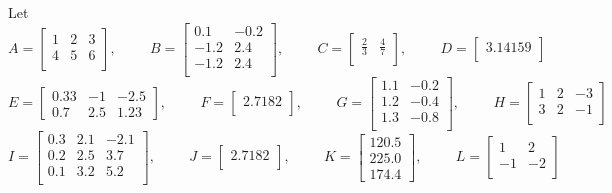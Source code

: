 Let 
\[
A
= 
\begin{bmatrix}
1 & 2 & 3 \\
4 & 5 & 6 \\
\end{bmatrix}
, 
\hspace{1cm}
B
= 
\begin{bmatrix}
0.1 & -0.2 \\
-1.2 & 2.4 \\
-1.2 & 2.4 \\
\end{bmatrix}
, 
\hspace{1cm}
C
= 
\begin{bmatrix}
\frac{2}{3} & \frac{4}{7} \\
\end{bmatrix}
, 
\hspace{1cm}
D
= 
\begin{bmatrix}
3.14159 \\
\end{bmatrix}
\]
\[
E
= 
\begin{bmatrix}
0.33 & -1 & -2.5 \\
0.7 & 2.5 & 1.23
\end{bmatrix}
, 
\hspace{1cm}
F
= 
\begin{bmatrix}
2.7182 \\
\end{bmatrix}
, 
\hspace{1cm}
G
= 
\begin{bmatrix}
1.1 & -0.2 \\
1.2 & -0.4 \\
1.3 & -0.8 \\
\end{bmatrix}
, 
\hspace{1cm}
H
= 
\begin{bmatrix}
1 & 2 & -3 \\
3 & 2 & -1 \\
\end{bmatrix}
\]
\[
I
= 
\begin{bmatrix}
0.3 & 2.1 & -2.1 \\
0.2 & 2.5 & 3.7 \\
0.1 & 3.2 & 5.2 \\
\end{bmatrix}
, 
\hspace{1cm}
J
= 
\begin{bmatrix}
2.7182 \\
\end{bmatrix}
, 
\hspace{1cm}
K
= 
\begin{bmatrix}
120.5 \\
225.0 \\
174.4
\end{bmatrix}
, 
\hspace{1cm}
L
= 
\begin{bmatrix}
1 & 2 \\
-1 & -2 \\
\end{bmatrix}
\]

